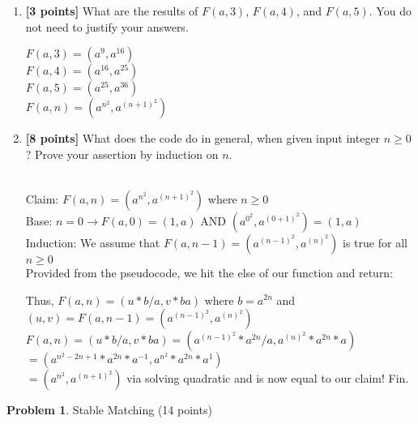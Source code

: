 \documentclass[11pt]{article}
\newcommand\tab[1][1cm]{\hspace*{#1}}
\theoremstyle{definition}
\theoremstyle{theorem}
\newtheorem{prob}{Problem}
\newcommand{\solution}{\medskip\noindent{\color{DarkBlue}\textbf{Solution:}}}
\begin{document}
\begin{enumerate}[label=(\alph*)]
\item \textbf{[3 points]} What are the results of $F(a,3)$, $F(a,4)$, and $F(a,5)$.  You do not need to justify your answers.

\solution

$F(a,3) = (a^{9}, a^{16})$\\
$F(a,4) = (a^{16}, a^{25})$\\
$F(a,5) = (a^{25}, a^{36})$\\
$F(a, n) = (a^{n^2}, a^{(n+1)^2})$

\item \textbf{[8 points]} What does the code do in general, when given input integer $n
  \ge 0$? Prove your assertion by induction on $n$.

\solution \\

Claim: $F(a, n) = (a^{n^2}, a^{(n+1)^2})$ where $n \ge 0$ \\
Base: $n = 0 \rightarrow F(a, 0) = (1,a)$ AND $(a^{0^2}, a^{(0+1)^2}) = (1, a)$ \\
Induction: We assume that $F(a, n-1) = (a^{(n-1)^2}, a^{(n)^2})$ is true for all $n \ge 0$\\

Provided from the pseudocode, we hit the else of our function and return:

\tab Thus, $F(a, n) = (u * b/a, v *ba)$ where $b = a^{2n}$ and $(u, v) = F(a, n-1) = (a^{(n-1)^2}, a^{(n)^2})$  \\
\tab $F(a, n) = (u * b/a, v *ba) =  (a^{(n-1)^2} * a^{2n}/a, a^{(n)^2} * a^{2n}*a)$ \\
\tab \tab $= (a^{n^2 - 2n +1} * a^{2n} * a^{-1}, a^{n^2} * a^{2n} * a^1)$ \\
\tab \tab $= (a^{n^2}, a^{(n+1)^2})$ via solving quadratic and is now equal to our claim! Fin.
\end{enumerate}

\newpage
\begin{prob} Stable Matching (14 points) \end{prob}
\end{document}
